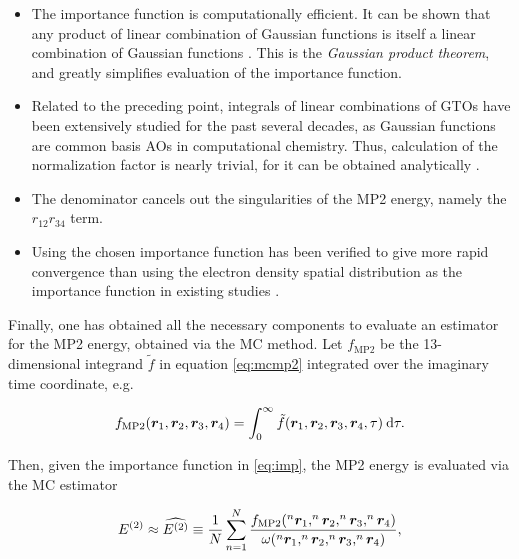\begin{itemize}

\item The importance function is computationally efficient. It can be shown that
	any product of linear combination of Gaussian functions is itself a
	linear combination of Gaussian functions \cite{gaussian}. This is the
	\emph{Gaussian product theorem}, and greatly simplifies evaluation of
	the importance function.

\item Related to the preceding point, integrals of linear combinations of GTOs
	have been extensively studied for the past several decades, as Gaussian
	functions are common basis AOs in computational chemistry. Thus,
	calculation of the normalization factor is nearly trivial, for it can be
	obtained analytically \cite{gaussian-eval}.

\item The denominator cancels out the singularities of the MP2 energy, namely
	the $r_{12}r_{34}$ term.

\item Using the chosen importance function has been verified to give more rapid
	convergence than using the electron density spatial distribution as the
	importance function in existing studies \cite{willow1}.

\end{itemize}

Finally, one has obtained all the necessary components to evaluate an estimator
for the MP2 energy, obtained via the MC method. Let $f_\text{MP2}$ be the
13-dimensional integrand $\tilde f$ in equation \ref{eq:mcmp2} integrated over the
imaginary time coordinate, e.g.

\begin{equation}
f_\text{MP2}(\bm r_1, \bm r_2, \bm r_3, \bm r_4)
=
\int_0^\infty
\tilde f(\bm r_1, \bm r_2, \bm r_3, \bm r_4, \tau)
\:\mathrm{d}\tau.
\end{equation}

\noindent Then, given the importance function in \ref{eq:imp}, the MP2 energy is
evaluated via the MC estimator

\begin{equation}
\perturbE[]{2}
\approx
\widehat{\perturbE[]{2}}
\equiv
\frac{1}{N}
\sum_{n = 1}^N
\frac
{f_\text{MP2}(^n\bm r_1, ^n\bm r_2, ^n\bm r_3, ^n\bm r_4)}
{\omega(^n\bm r_1, ^n\bm r_2, ^n\bm r_3, ^n\bm r_4)},
\label{eq:walkers}
\end{equation}

